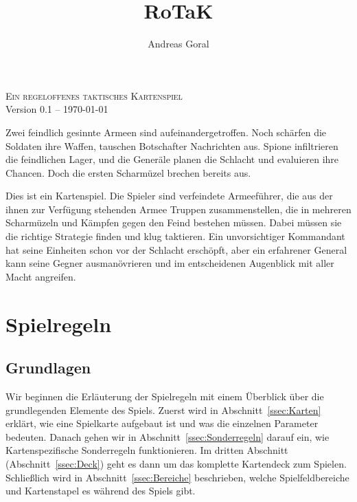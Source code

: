 \documentclass[a4paper,11pt]{report}
\title{RoTaK}
\author{Andreas Goral}
\newcommand{\sref}[1]{Abschnitt~\ref{#1}}
\begin{document}
\begin{titlepage}
\begin{center}
\textsc{
{\huge Ein regeloffenes taktisches Kartenspiel}}\\[0.5cm]
Version 0.1 -- \today \\
\vfill
\end{center}
\end{titlepage}
\tableofcontents
\newpage

Zwei feindlich gesinnte Armeen sind aufeinandergetroffen. Noch schärfen die Soldaten ihre Waffen, tauschen Botschafter Nachrichten aus. Spione infiltrieren die feindlichen Lager, und die Generäle planen die Schlacht und evaluieren ihre Chancen. Doch die ersten Scharmüzel brechen bereits aus.

Dies ist ein Kartenspiel. Die Spieler sind verfeindete Armeeführer, die aus der ihnen zur Verfügung stehenden Armee Truppen zusammenstellen, die in mehreren Scharmüzeln und Kämpfen gegen den Feind bestehen müssen. Dabei müssen sie die richtige Strategie finden und klug taktieren. Ein unvorsichtiger Kommandant hat seine Einheiten schon vor der Schlacht erschöpft, aber ein erfahrener General kann seine Gegner ausmanövrieren und im entscheidenen Augenblick mit aller Macht angreifen.

\chapter{Spielregeln}
\section{Grundlagen}
Wir beginnen die Erläuterung der Spielregeln mit einem Überblick über die grundlegenden Elemente des Spiels. Zuerst wird in \sref{ssec:Karten} erklärt, wie eine Spielkarte aufgebaut ist und was die einzelnen Parameter bedeuten. Danach gehen wir in \sref{ssec:Sonderregeln} darauf ein, wie Kartenspezifische Sonderregeln funktionieren. Im dritten Abschnitt (\sref{ssec:Deck}) geht es dann um das komplette Kartendeck zum Spielen. Schließlich wird in \sref{ssec:Bereiche} beschrieben, welche Spielfeldbereiche und Kartenstapel es während des Spiels gibt.
\end{document}
